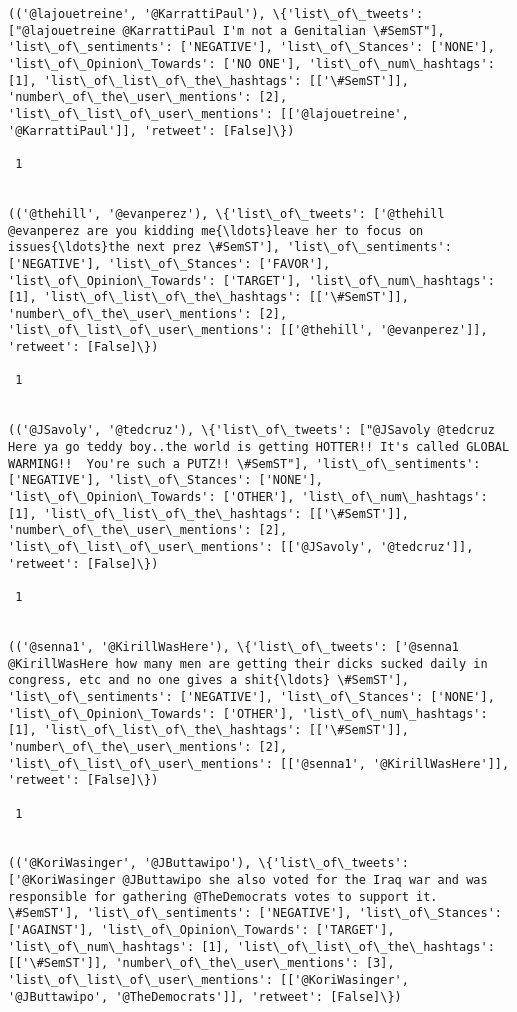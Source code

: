 \documentclass[11pt]{article}
\begin{document}
\begin{Verbatim}[commandchars=\\\{\}]
(('@lajouetreine', '@KarrattiPaul'), \{'list\_of\_tweets': ["@lajouetreine @KarrattiPaul I'm not a Genitalian \#SemST"], 'list\_of\_sentiments': ['NEGATIVE'], 'list\_of\_Stances': ['NONE'], 'list\_of\_Opinion\_Towards': ['NO ONE'], 'list\_of\_num\_hashtags': [1], 'list\_of\_list\_of\_the\_hashtags': [['\#SemST']], 'number\_of\_the\_user\_mentions': [2], 'list\_of\_list\_of\_user\_mentions': [['@lajouetreine', '@KarrattiPaul']], 'retweet': [False]\})

 1
 

(('@thehill', '@evanperez'), \{'list\_of\_tweets': ['@thehill @evanperez are you kidding me{\ldots}leave her to focus on issues{\ldots}the next prez \#SemST'], 'list\_of\_sentiments': ['NEGATIVE'], 'list\_of\_Stances': ['FAVOR'], 'list\_of\_Opinion\_Towards': ['TARGET'], 'list\_of\_num\_hashtags': [1], 'list\_of\_list\_of\_the\_hashtags': [['\#SemST']], 'number\_of\_the\_user\_mentions': [2], 'list\_of\_list\_of\_user\_mentions': [['@thehill', '@evanperez']], 'retweet': [False]\})

 1
 

(('@JSavoly', '@tedcruz'), \{'list\_of\_tweets': ["@JSavoly @tedcruz Here ya go teddy boy..the world is getting HOTTER!! It's called GLOBAL WARMING!!  You're such a PUTZ!! \#SemST"], 'list\_of\_sentiments': ['NEGATIVE'], 'list\_of\_Stances': ['NONE'], 'list\_of\_Opinion\_Towards': ['OTHER'], 'list\_of\_num\_hashtags': [1], 'list\_of\_list\_of\_the\_hashtags': [['\#SemST']], 'number\_of\_the\_user\_mentions': [2], 'list\_of\_list\_of\_user\_mentions': [['@JSavoly', '@tedcruz']], 'retweet': [False]\})

 1
 

(('@senna1', '@KirillWasHere'), \{'list\_of\_tweets': ['@senna1 @KirillWasHere how many men are getting their dicks sucked daily in congress, etc and no one gives a shit{\ldots} \#SemST'], 'list\_of\_sentiments': ['NEGATIVE'], 'list\_of\_Stances': ['NONE'], 'list\_of\_Opinion\_Towards': ['OTHER'], 'list\_of\_num\_hashtags': [1], 'list\_of\_list\_of\_the\_hashtags': [['\#SemST']], 'number\_of\_the\_user\_mentions': [2], 'list\_of\_list\_of\_user\_mentions': [['@senna1', '@KirillWasHere']], 'retweet': [False]\})

 1
 

(('@KoriWasinger', '@JButtawipo'), \{'list\_of\_tweets': ['@KoriWasinger @JButtawipo she also voted for the Iraq war and was responsible for gathering @TheDemocrats votes to support it. \#SemST'], 'list\_of\_sentiments': ['NEGATIVE'], 'list\_of\_Stances': ['AGAINST'], 'list\_of\_Opinion\_Towards': ['TARGET'], 'list\_of\_num\_hashtags': [1], 'list\_of\_list\_of\_the\_hashtags': [['\#SemST']], 'number\_of\_the\_user\_mentions': [3], 'list\_of\_list\_of\_user\_mentions': [['@KoriWasinger', '@JButtawipo', '@TheDemocrats']], 'retweet': [False]\})


\end{Verbatim}
\end{document}
